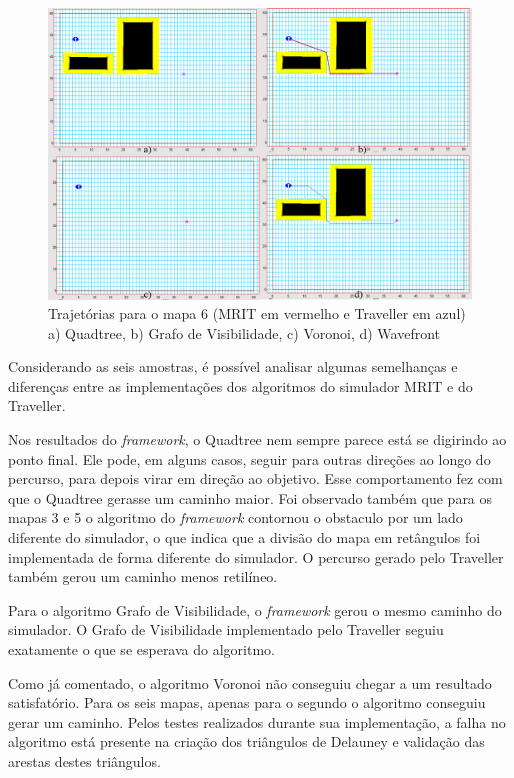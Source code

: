 \begin{figure}[h]
	\centering
	\label{fig44}
		\includegraphics[keepaspectratio=true,scale=0.25]{figuras/mapa6.jpg}
	\caption{Trajetórias para o mapa 6 (MRIT em vermelho e Traveller em azul) a) Quadtree, b) Grafo de Visibilidade, c) Voronoi, d) Wavefront}
\end{figure}

Considerando as seis amostras, é possível analisar algumas semelhanças e diferenças entre as implementações dos algoritmos do simulador MRIT e do Traveller.

Nos resultados do \textit{framework}, o Quadtree nem sempre parece está se digirindo ao ponto final. Ele pode, em alguns casos, seguir para outras direções ao longo do percurso, para depois virar em direção ao objetivo. Esse comportamento fez com que o Quadtree gerasse um caminho maior. Foi observado também que para os mapas 3 e 5 o algoritmo do \textit{framework} contornou o obstaculo por um lado diferente do simulador, o que indica que a divisão do mapa em retângulos foi implementada de forma diferente do simulador. O percurso gerado pelo Traveller também gerou um caminho menos retilíneo.

Para o algoritmo Grafo de Visibilidade, o \textit{framework} gerou o mesmo caminho do simulador. O Grafo de Visibilidade implementado pelo Traveller seguiu exatamente o que se esperava do algoritmo.

Como já comentado, o algoritmo Voronoi não conseguiu chegar a um resultado satisfatório. Para os seis mapas, apenas para o segundo o algoritmo conseguiu gerar um caminho. Pelos testes realizados durante sua implementação, a falha no algoritmo está presente na criação dos triângulos de Delauney e validação das arestas destes triângulos.

